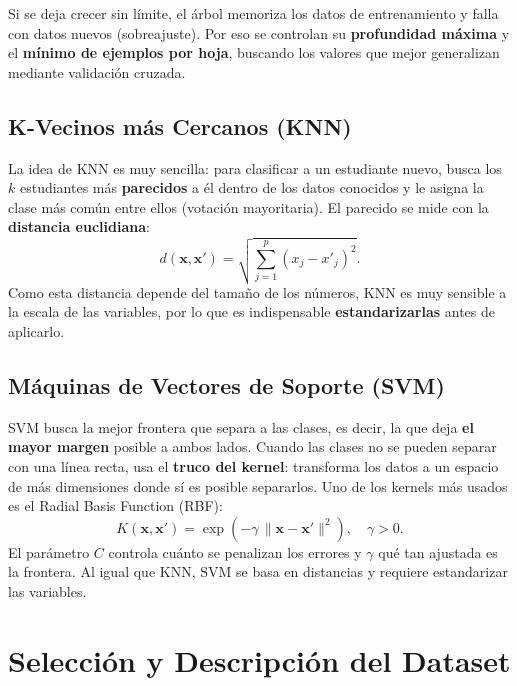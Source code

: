 \documentclass[11pt,letterpaper,twoside]{article}
\begin{document}
\begin{nota}
Si se deja crecer sin límite, el árbol memoriza los datos de entrenamiento y falla con datos nuevos (sobreajuste). Por eso se controlan su \textbf{profundidad máxima} y el \textbf{mínimo de ejemplos por hoja}, buscando los valores que mejor generalizan mediante validación cruzada.
\end{nota}

\subsection{K-Vecinos más Cercanos (KNN)}
La idea de KNN es muy sencilla: para clasificar a un estudiante nuevo, busca los $k$ estudiantes más \textbf{parecidos} a él dentro de los datos conocidos y le asigna la clase más común entre ellos (votación mayoritaria). El parecido se mide con la \textbf{distancia euclidiana}:
\begin{equation}
d(\mathbf{x},\mathbf{x}') = \sqrt{\sum_{j=1}^{p}\left(x_j - x'_j\right)^2}.
\label{eq:euclidiana}
\end{equation}
Como esta distancia depende del tamaño de los números, KNN es muy sensible a la escala de las variables, por lo que es indispensable \textbf{estandarizarlas} antes de aplicarlo.

\subsection{Máquinas de Vectores de Soporte (SVM)}
SVM busca la mejor frontera que separa a las clases, es decir, la que deja \textbf{el mayor margen} posible a ambos lados. Cuando las clases no se pueden separar con una línea recta, usa el \textbf{truco del kernel}: transforma los datos a un espacio de más dimensiones donde sí es posible separarlos. Uno de los kernels más usados es el Radial Basis Function (RBF):
\begin{equation}
K(\mathbf{x},\mathbf{x}') = \exp\!\left(-\gamma\,\lVert \mathbf{x}-\mathbf{x}' \rVert^2\right), \quad \gamma > 0.
\label{eq:rbf}
\end{equation}
El parámetro $C$ controla cuánto se penalizan los errores y $\gamma$ qué tan ajustada es la frontera. Al igual que KNN, SVM se basa en distancias y requiere estandarizar las variables.

\section{Selección y Descripción del Dataset}
\label{sec:seleccion}
\end{document}
